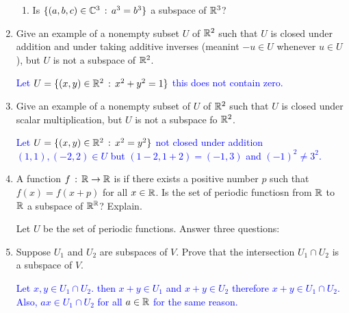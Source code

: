 \documentclass[10pt,a4paper]{report}
\newcommand{\BLUE}[1]{\textcolor{blue}{#1}}
\begin{document}
\begin{enumerate}
\begin{enumerate}
	\item Is $\{(a,b,c)\in\mathbb{C}^3\,:\, a^3=b^3\}$ a subspace of $\mathbb{R}^3$?
\end{enumerate}

\item Give an example of a nonempty subset $U$ of $\mathbb{R}^2$ such that $U$ is closed under addition and under taking additive inverses (meanint $-u \in U$ whenever $u\in U$), but $U$ is not a subspace of $\mathbb{R}^2$.

\BLUE{Let $U=\{(x,y)\in \mathbb{R}^2\,:\, x^2+y^2=1\}$ this does not contain zero.
}

\item Give an example of a nonempty subset of $U$ of $\mathbb{R}^2$ such that $U$ is closed under scalar multiplication, but $U$ is not a subspace fo $\mathbb{R}^2$.

\BLUE{Let $U=\{(x,y)\in \mathbb{R}^2\,:\, x^2=y^2\}$ not closed under addition $(1,1), (-2,2) \in U$ but $(1-2, 1+2)=(-1,3)$ and $(-1)^2 \ne 3^2$.
}

\item A function $f\,:\,\mathbb{R}\to\mathbb{R}$ is  if there exists a positive number $p$ such that $f(x)=f(x+p)$ for all $ x\in \mathbb{R}$.  Is the set of periodic functiosn from $\mathbb{R}$ to $\mathbb{R}$ a subspace of $\mathbb{R}^{\mathbb{R}}$? Explain.

Let $U$ be the set of periodic functions.  Answer three questions:


\item Suppose $U_1$ and $U_2$ are subspaces of $V$.  Prove that the intersection $U_1\cap U_2$ is a subspace of $V$.

\BLUE{Let $x,y \in U_1\cap U_2$.  then $x+y \in U_1$ and $x+y \in U_2$ therefore $x+y \in U_1\cap U_2$.  Also, $ax \in U_1 \cap U_2$ for all $a\in \mathbb{R}$ for the same reason.  
}


\end{enumerate}
\end{document}
